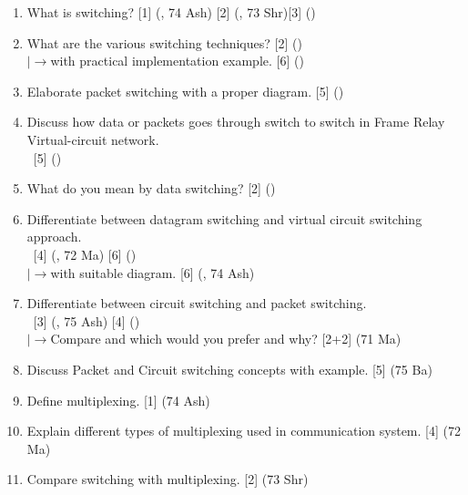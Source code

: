 \documentclass[12pt]{article}
\newcommand{\lb}{\\$\left|\rightarrow\right.$}
\newcommand{\enter}{\\\textcolor{white}{1}}
\begin{document}
		\begin{enumerate}[noitemsep, topsep=0pt]
			\item What is switching? \hfill [1] (, 74 Ash) [2] (, 73 Shr)[3] ()
			
			\item What are the various switching techniques? \hfill [2] ()
			\lb with practical implementation example. \hfill [6] ()

			\item Elaborate packet switching with a proper diagram. \hfill [5] ()	
			
			\item Discuss how data or packets goes through switch to switch in Frame Relay Virtual-circuit network.
			\enter\hfill [5] ()
			
			\item What do you mean by data switching? \hfill [2] ()
			
			\item Differentiate between datagram switching and virtual circuit switching approach. 
			\enter \hfill [4] (, 72 Ma) [6] ()
			\lb with suitable diagram. \hfill [6] (, 74 Ash)
			
			\item Differentiate between circuit switching and packet switching. 
			\enter\hfill [3] (, 75 Ash) [4] ()
			\lb Compare and which would you prefer and why? \hfill [2+2] (71 Ma)
			
			\item Discuss Packet and Circuit switching concepts with example. \hfill [5] (75 Ba)
			
			\item Define multiplexing. \hfill [1] (74 Ash)
			
			\item Explain different types of multiplexing used in communication system. \hfill [4] (72 Ma)
			
			\item Compare switching with multiplexing. \hfill [2] (73 Shr)
		\end{enumerate}
\end{document}
